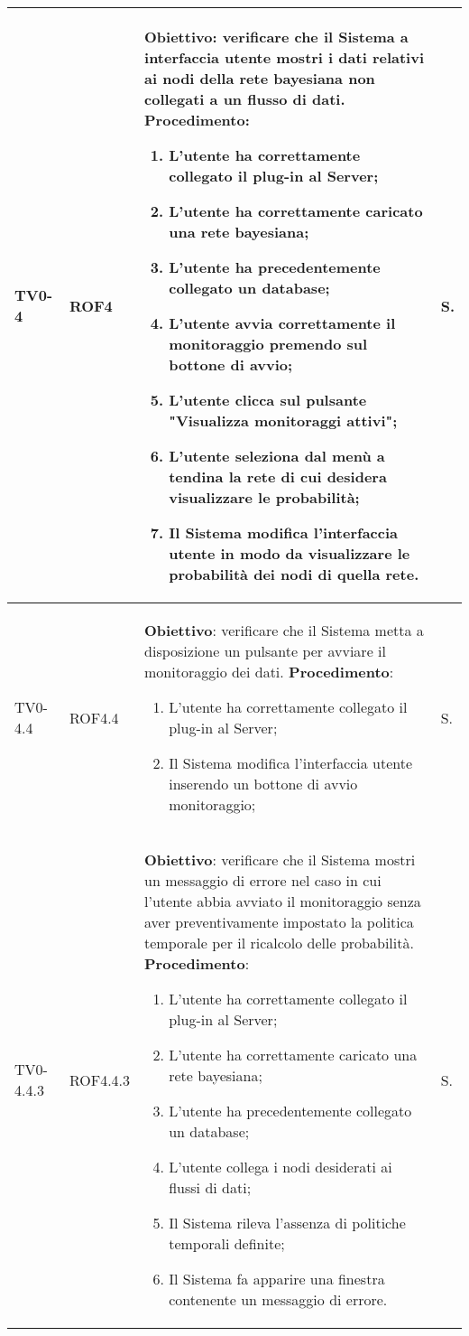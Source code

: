 \begin{longtable}{|C{.15\textwidth}|C{.13\textwidth}|m{.65\textwidth}|C{.08\textwidth}|}
TV0-4 & ROF4 &
	\textbf{Obiettivo}: verificare che il Sistema a interfaccia utente mostri i dati relativi ai nodi della rete bayesiana non collegati a un flusso di dati. \newline
	\textbf{Procedimento}:
	\begin{enumerate}
		\item L'utente ha correttamente collegato il plug-in al Server;
		\item L'utente ha correttamente caricato una rete bayesiana;
		\item L'utente ha precedentemente collegato un database;
		\item L'utente avvia correttamente il monitoraggio premendo sul bottone di avvio;
		\item L'utente clicca sul pulsante "Visualizza monitoraggi attivi";
		\item L'utente seleziona dal menù a tendina la rete di cui desidera visualizzare le probabilità;
		\item Il Sistema modifica l'interfaccia utente in modo da visualizzare le probabilità dei nodi di quella rete.
	\end{enumerate}
	& S. \\
\hline

TV0-4.4 & ROF4.4 &
	\textbf{Obiettivo}: verificare che il Sistema metta a disposizione un pulsante per avviare il monitoraggio dei dati. \newline
	\textbf{Procedimento}:
	\begin{enumerate}
		\item L'utente ha correttamente collegato il plug-in al Server;
		\item Il Sistema modifica l'interfaccia utente inserendo un bottone di avvio monitoraggio;
	\end{enumerate}
	& S. \\
\hline

TV0-4.4.3 & ROF4.4.3 &
	\textbf{Obiettivo}: verificare che il Sistema mostri un messaggio di errore nel caso in cui l'utente abbia avviato il monitoraggio senza aver preventivamente impostato la politica temporale per il ricalcolo delle probabilità. \newline
	\textbf{Procedimento}:
	\begin{enumerate}
		\item L'utente ha correttamente collegato il plug-in al Server;
		\item L'utente ha correttamente caricato una rete bayesiana;
		\item L'utente ha precedentemente collegato un database;
		\item L'utente collega i nodi desiderati ai flussi di dati;
		\item Il Sistema rileva l'assenza di politiche temporali definite;
		\item Il Sistema fa apparire una finestra contenente un messaggio di errore.
	\end{enumerate}
	& S. \\
\hline


\end{longtable}
